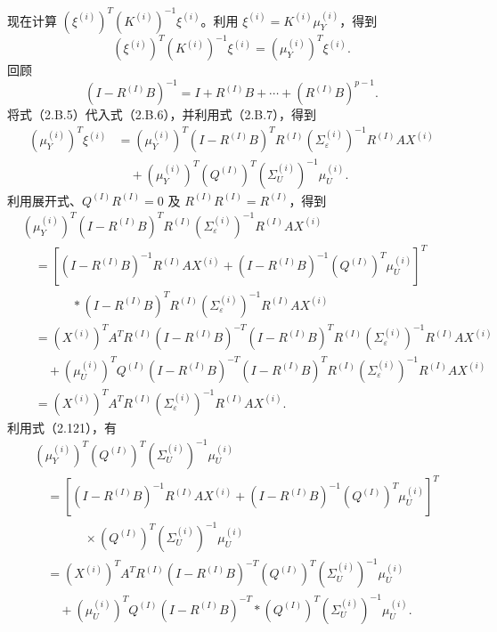现在计算 $(\xi^{(i)})^T(K^{(i)})^{-1}\xi^{(i)}$。利用 $\xi^{(i)}=K^{(i)}\mu_Y^{(i)}$，得到
\begin{equation}
(\xi^{(i)})^T(K^{(i)})^{-1}\xi^{(i)}
 =(\mu_Y^{(i)})^T\xi^{(i)}.\tag{2.B.6}
\end{equation}
回顾
\begin{equation}
(I-R^{(I)}B)^{-1}
 =I+R^{(I)}B+\cdots+(R^{(I)}B)^{p-1}.\tag{2.B.7}
\end{equation}
将式（2.B.5）代入式（2.B.6），并利用式（2.B.7），得到
\begin{equation}
\begin{aligned}
(\mu_Y^{(i)})^T\xi^{(i)}
 &=(\mu_Y^{(i)})^T(I-R^{(I)}B)^TR^{(I)}
   (\Sigma_\varepsilon^{(i)})^{-1}R^{(I)}AX^{(i)}\\
 &\quad+(\mu_Y^{(i)})^T(Q^{(I)})^T
   (\Sigma_U^{(i)})^{-1}\mu_U^{(i)}.
\end{aligned}\tag{2.B.8}
\end{equation}
利用展开式、$Q^{(I)}R^{(I)}=0$ 及 $R^{(I)}R^{(I)}=R^{(I)}$，得到
\begin{equation}
\begin{aligned}
&(\mu_Y^{(i)})^T(I-R^{(I)}B)^TR^{(I)}
 (\Sigma_\varepsilon^{(i)})^{-1}R^{(I)}AX^{(i)}\\
&\quad=\left[(I-R^{(I)}B)^{-1}R^{(I)}AX^{(i)}
 +(I-R^{(I)}B)^{-1}(Q^{(I)})^T\mu_U^{(i)}\right]^T\\
&\qquad\qquad{}\ast(I-R^{(I)}B)^TR^{(I)}
 (\Sigma_\varepsilon^{(i)})^{-1}R^{(I)}AX^{(i)}\\
&\quad=(X^{(i)})^TA^TR^{(I)}(I-R^{(I)}B)^{-T}
 (I-R^{(I)}B)^TR^{(I)}(\Sigma_\varepsilon^{(i)})^{-1}R^{(I)}AX^{(i)}\\
&\qquad+(\mu_U^{(i)})^TQ^{(I)}(I-R^{(I)}B)^{-T}
 (I-R^{(I)}B)^TR^{(I)}(\Sigma_\varepsilon^{(i)})^{-1}R^{(I)}AX^{(i)}\\
&\quad=(X^{(i)})^TA^TR^{(I)}
 (\Sigma_\varepsilon^{(i)})^{-1}R^{(I)}AX^{(i)}.
\end{aligned}\tag{2.B.9}
\end{equation}
利用式（2.121），有
\begin{equation}
\begin{aligned}
&(\mu_Y^{(i)})^T(Q^{(I)})^T(\Sigma_U^{(i)})^{-1}\mu_U^{(i)}\\
&\quad=\left[(I-R^{(I)}B)^{-1}R^{(I)}AX^{(i)}
 +(I-R^{(I)}B)^{-1}(Q^{(I)})^T\mu_U^{(i)}\right]^T\\
&\qquad\qquad{}\times(Q^{(I)})^T(\Sigma_U^{(i)})^{-1}\mu_U^{(i)}\\
&\quad=(X^{(i)})^TA^TR^{(I)}(I-R^{(I)}B)^{-T}
 (Q^{(I)})^T(\Sigma_U^{(i)})^{-1}\mu_U^{(i)}\\
&\qquad+(\mu_U^{(i)})^TQ^{(I)}(I-R^{(I)}B)^{-T}
 {}\ast(Q^{(I)})^T(\Sigma_U^{(i)})^{-1}\mu_U^{(i)}.
\end{aligned}\tag{2.B.10}
\end{equation}
